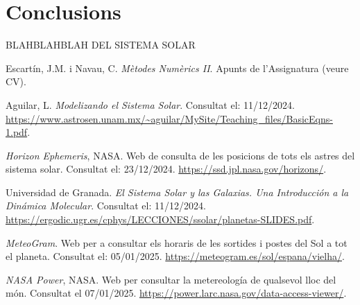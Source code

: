 \documentclass[10pt, twoside, a4paper]{article}
\begin{document}
\begin{table}[h!]
    \centering
    \caption{Taula comparativa de l'energia generada durant un any amb el model PVGIS i el nostre. }
\end{table}

\section{Conclusions}

BLAHBLAHBLAH DEL SISTEMA SOLAR

\newpage
\begin{thebibliography}{99}
    Escartín, J.M. i Navau, C. \textit{Mètodes Numèrics II}. Apunts de l'Assignatura (veure CV).

    Aguilar, L. \textit{Modelizando el Sistema Solar}. Consultat el: 11/12/2024. \url{https://www.astrosen.unam.mx/~aguilar/MySite/Teaching_files/BasicEqns-1.pdf}.

    \textit{Horizon Ephemeris}, NASA. Web de consulta de les posicions de tots els astres del sistema solar. Consultat el: 23/12/2024. \url{https://ssd.jpl.nasa.gov/horizons/}.

    Universidad de Granada. \textit{El Sistema Solar y las Galaxias. Una Introducción a la Dinámica Molecular}. Consultat el: 11/12/2024. \url{https://ergodic.ugr.es/cphys/LECCIONES/ssolar/planetas-SLIDES.pdf}.

    \textit{MeteoGram}. Web per a consultar els horaris de les sortides i postes del Sol a tot el planeta. Consultat el: 05/01/2025. \url{https://meteogram.es/sol/espana/vielha/}.

    \textit{NASA Power}, NASA. Web per consultar la metereología de qualsevol lloc del món. Consultat el 07/01/2025. \url{https://power.larc.nasa.gov/data-access-viewer/}.

    
\end{thebibliography}
\end{document}
